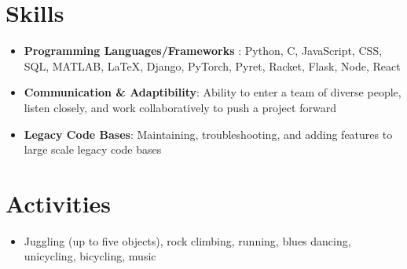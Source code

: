 \documentclass[letterpaper,11pt]{article}
\newcommand{\resumeSubHeadingListStart}{\begin{itemize}[leftmargin=*]}
\newcommand{\resumeSubHeadingListEnd}{\end{itemize}}
\begin{document}
\section{Skills}
  \resumeSubHeadingListStart
    \item \textbf{Programming Languages/Frameworks} : Python, C, JavaScript, CSS, SQL, MATLAB, \LaTeX, Django, PyTorch, Pyret, Racket, Flask, Node, React
    \item \textbf{Communication \& Adaptibility}: Ability to enter a team of diverse people, listen closely, and work collaboratively to push a project forward
    \item \textbf{Legacy Code Bases}: Maintaining, troubleshooting, and adding features to large scale legacy code bases
  \resumeSubHeadingListEnd
\section{Activities}
    \resumeSubHeadingListStart
    \item Juggling (up to five objects), rock climbing, running, blues dancing, unicycling, bicycling, music
  \resumeSubHeadingListEnd
\end{document}
